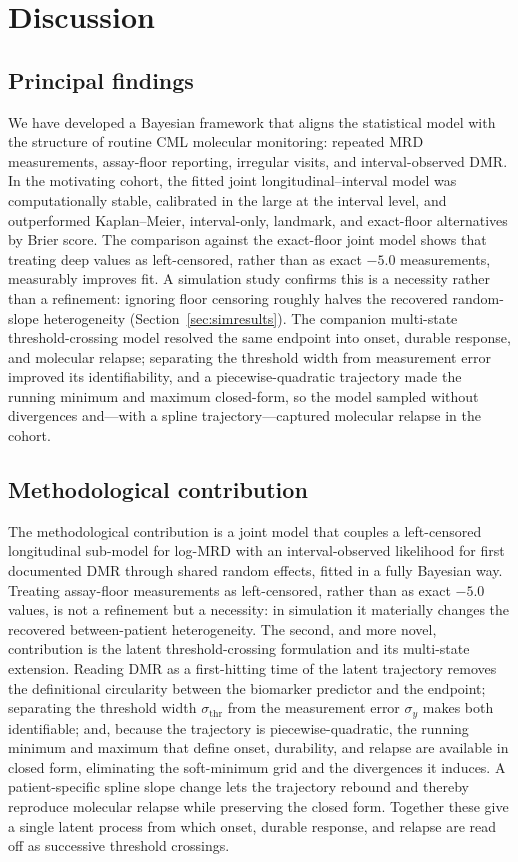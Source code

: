 \documentclass[11pt]{article}
\begin{document}
\section{Discussion}

\subsection{Principal findings}

We have developed a Bayesian framework that aligns the statistical model
with the structure of routine CML molecular monitoring: repeated MRD
measurements, assay-floor reporting, irregular visits, and
interval-observed DMR. In the motivating cohort, the fitted joint
longitudinal--interval model was computationally stable, calibrated in the
large at the interval level, and outperformed Kaplan--Meier,
interval-only, landmark, and exact-floor alternatives by Brier score. The
comparison against the exact-floor joint model shows that treating deep
values as left-censored, rather than as exact $-5.0$ measurements,
measurably improves fit. A simulation study confirms this is a necessity
rather than a refinement: ignoring floor censoring roughly halves the
recovered random-slope heterogeneity (Section~\ref{sec:simresults}). The
companion multi-state threshold-crossing model resolved the same endpoint into
onset, durable response, and molecular relapse; separating the threshold width
from measurement error improved its identifiability, and a piecewise-quadratic
trajectory made the running minimum and maximum closed-form, so the model
sampled without divergences and---with a spline trajectory---captured molecular
relapse in the cohort.

\subsection{Methodological contribution}

The methodological contribution is a joint model that couples a
left-censored longitudinal sub-model for log-MRD with an interval-observed
likelihood for first documented DMR through shared random effects, fitted in
a fully Bayesian way. Treating assay-floor measurements as left-censored,
rather than as exact $-5.0$ values, is not a refinement but a necessity: in
simulation it materially changes the recovered between-patient
heterogeneity. The second, and more novel, contribution is the latent threshold-crossing
formulation and its multi-state extension. Reading DMR as a first-hitting time
of the latent trajectory removes the definitional circularity between the
biomarker predictor and the endpoint; separating the threshold width
$\sigma_{\mathrm{thr}}$ from the measurement error $\sigma_y$ makes both
identifiable; and, because the trajectory is piecewise-quadratic, the running
minimum and maximum that define onset, durability, and relapse are available in
closed form, eliminating the soft-minimum grid and the divergences it induces.
A patient-specific spline slope change lets the trajectory rebound and thereby
reproduce molecular relapse while preserving the closed form. Together these
give a single latent process from which onset, durable response, and relapse
are read off as successive threshold crossings.
\end{document}
